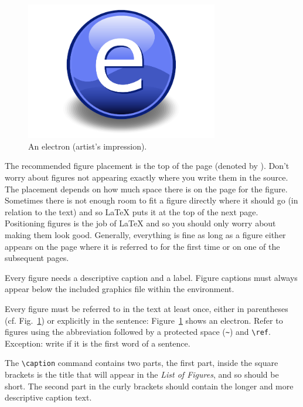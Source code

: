 \begin{figure}[t]
\centering
\includegraphics[width=0.75\textwidth]{Figures/Electron}
\decoRule
\caption[An Electron]{An electron (artist's impression).}
\label{fig:Electron}
\end{figure}

The recommended figure placement is the top of the page (denoted by \code{[t]}). Don't worry about figures not appearing exactly where you write them in the source. The placement depends on how much space there is on the page for the figure. Sometimes there is not enough room to fit a figure directly where it should go (in relation to the text) and so LaTeX puts it at the top of the next page. Positioning figures is the job of LaTeX and so you should only worry about making them look good. Generally, everything is fine as long as a figure either appears on the page where it is referred to for the first time or on one of the subsequent pages.

Every figure needs a descriptive caption and a label. Figure captions must always appear below the included graphics file within the  environment.

Every figure must be referred to in the text at least once, either in parentheses (cf. Fig.~\ref{fig:Electron}) or explicitly in the sentence: Figure~\ref{fig:Electron} shows an electron. Refer to figures using the abbreviation  followed by a protected space (\verb|~|) and \verb|\ref|. Exception: write  if it is the first word of a sentence.

The \verb|\caption| command contains two parts,%
the first part, inside the square brackets is the title that will appear in the \emph{List of Figures}, and so should be short.
 The second part in the curly brackets should contain the longer and more descriptive caption text.

